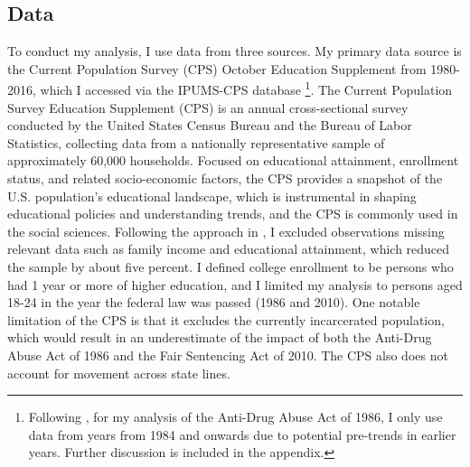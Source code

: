 \documentclass{article}
\begin{document}
\subsection{Data}
To conduct my analysis, I use data from three sources. My primary data source is the Current Population Survey (CPS) October Education Supplement from 1980-2016, which I accessed via the IPUMS-CPS database \citep{ipums_cps} \footnote{Following \cite{britton2022}, for my analysis of the Anti-Drug Abuse Act of 1986, I only use data from years from 1984 and onwards due to potential pre-trends in earlier years. Further discussion is included in the appendix.}. The Current Population Survey Education Supplement (CPS) is an annual cross-sectional survey conducted by the United States Census Bureau and the Bureau of Labor Statistics, collecting data from a nationally representative sample of approximately 60,000 households. Focused on educational attainment, enrollment status, and related socio-economic factors, the CPS provides a snapshot of the U.S. population's educational landscape, which is instrumental in shaping educational policies and understanding trends, and the CPS is commonly used in the social sciences. Following the approach in \cite{britton2022}, I excluded observations missing relevant data such as family income and educational attainment, which reduced the sample by about five percent. I defined college enrollment to be persons who had 1 year or more of higher education, and I limited my analysis to persons aged 18-24 in the year the federal law was passed (1986 and 2010). One notable limitation of the CPS is that it excludes the currently incarcerated population, which would result in an underestimate of the impact of both the Anti-Drug Abuse Act of 1986 and the Fair Sentencing Act of 2010. The CPS also does not account for movement across state lines.
\end{document}
